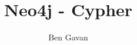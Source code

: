 \documentclass[]{article}
\title{Neo4j - Cypher}
\author{Ben Gavan}
\newcommand{\<}{\guilsinglleft}
\renewcommand{\>}{\guilsinglright}
\begin{document}
\maketitle

\section{}
\end{document}
